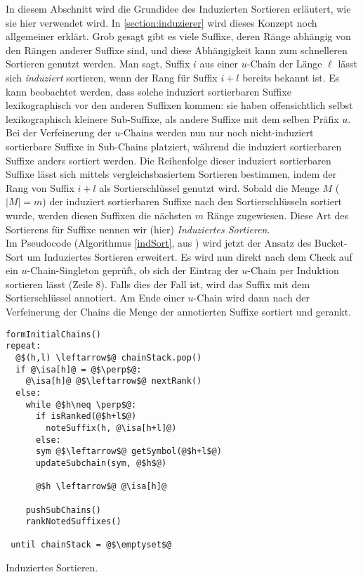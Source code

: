 In diesem Abschnitt wird die Grundidee des Induzierten Sortieren erläutert, wie sie hier verwendet wird. In \cref{section:induzierer} wird dieses Konzept noch allgemeiner erklärt. 
Grob gesagt gibt es viele Suffixe, deren Ränge abhängig von den Rängen anderer Suffixe sind, und diese Abhängigkeit kann zum schnelleren Sortieren genutzt werden.
Man sagt, Suffix $i$ aus einer $u$-Chain der Länge $\ell$ lässt sich \textit{induziert} sortieren, wenn der Rang für Suffix $i+l$ bereits bekannt ist.
Es kann beobachtet werden, dass solche induziert sortierbaren Suffixe lexikographisch vor den anderen Suffixen kommen: sie haben offensichtlich selbst lexikographisch kleinere Sub-Suffixe, als andere Suffixe mit dem selben Präfix $u$.
Bei der Verfeinerung der $u$-Chains werden nun nur noch nicht-induziert sortierbare Suffixe in Sub-Chains platziert, während die induziert sortierbaren Suffixe anders sortiert werden. Die Reihenfolge dieser induziert sortierbaren Suffixe lässt sich mittels vergleichsbasiertem Sortieren bestimmen, indem der Rang von Suffix $i+l$ als Sortierschlüssel genutzt wird. Sobald die Menge $M$ ($|M| = m$) der induziert sortierbaren Suffixe nach den Sortierschlüsseln sortiert wurde, werden diesen Suffixen die nächsten $m$ Ränge zugewiesen. Diese Art des Sortierens für Suffixe nennen wir (hier) \textit{Induziertes Sortieren}.\\

Im Pseudocode (Algorithmus \ref{indSort}, aus \cite{saca:8}) wird jetzt der Ansatz des Bucket-Sort um Induziertes Sortieren erweitert. Es wird nun direkt nach dem Check auf ein $u$-Chain-Singleton geprüft, ob sich der Eintrag der $u$-Chain per Induktion sortieren lässt (Zeile 8). Falls dies der Fall ist, wird das Suffix mit dem Sortierschlüssel annotiert. Am Ende einer $u$-Chain wird dann nach der Verfeinerung der Chains die Menge der annotierten Suffixe sortiert und gerankt.

\begin{listing}[htp]
\begin{verbatim}
formInitialChains()
repeat:
  @$(h,l) \leftarrow$@ chainStack.pop()	
  if @\isa[h]@ = @$\perp$@:
    @\isa[h]@ @$\leftarrow$@ nextRank()		
  else:
    while @$h\neq \perp$@:
      if isRanked(@$h+l$@)
        noteSuffix(h, @\isa[h+l]@)
      else:
      sym @$\leftarrow$@ getSymbol(@$h+l$@)
      updateSubchain(sym, @$h$@)
      
      @$h \leftarrow$@ @\isa[h]@
   
    pushSubChains()	
    rankNotedSuffixes()
  				
 until chainStack = @$\emptyset$@
\end{verbatim}
\caption{Induziertes Sortieren.}
\label{indSort}
\end{listing}

